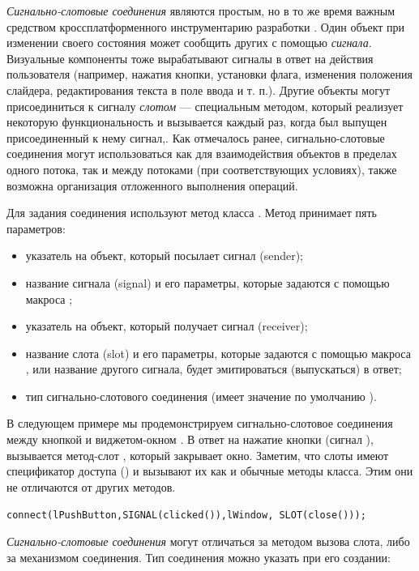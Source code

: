 \emph{Сигнально-слотовые соединения} являются простым, но в то же время важным
средством кроссплатформенного инструментарию разработки .  Один объект при изменении своего состояния может сообщить
других с помощью \emph{сигнала}. Визуальные компоненты тоже вырабатывают сигналы в ответ на действия
пользователя (например, нажатия  кнопки, установки флага, изменения положения слайдера, редактирования текста в поле
ввода  и т. п.). Другие объекты могут присоединиться к сигналу \emph{слотом} --- специальным методом,
который реализует некоторую функциональность  и вызывается каждый раз, когда был выпущен присоединенный к нему сигнал,.
Как отмечалось ранее, сигнально-слотовые соединения могут использоваться как для взаимодействия объектов в пределах
одного потока, так и между потоками (при соответствующих условиях), также возможна организация отложенного выполнения
операций. 

Для задания соединения используют метод  класса . Метод принимает пять параметров:

\begin{itemize}
\item указатель на объект, который посылает сигнал (sender);
\item название сигнала (signal) и его параметры, которые задаются с помощью макроса ;
\item указатель на объект, который получает сигнал (receiver);
\item название слота (slot) и его параметры, которые задаются с помощью макроса , или название другого
сигнала, будет эмитироваться (выпускаться) в ответ;
\item тип сигнально-слотового соединения (имеет значение по умолчанию ).
\end{itemize}
В следующем примере мы продемонстрируем сигнально-слотовое соединения между кнопкой  и
виджетом-окном . В ответ на нажатие кнопки (сигнал ), вызывается
метод-слот , который закрывает окно. Заметим, что слоты имеют спецификатор доступа
() и вызывают их как и обычные методы класса. Этим они не отличаются от других
методов.

\lstinline!connect(lPushButton,SIGNAL(clicked()),lWindow, SLOT(close()));!

\emph{Сигнально-слотовые соединения} могут отличаться за методом вызова слота, либо за механизмом соединения.
Тип соединения можно указать при его создании:

